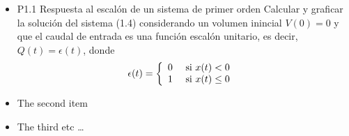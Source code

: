 \documentclass{article}
\begin{document}
% 
% 
% 
% 
% 
% 

\begin{itemize}

  \item P1.1 Respuesta al escalón de un sistema de primer orden
Calcular y graficar la solución del sistema (1.4) considerando un volumen inincial $ V(0)=0 $ y que el caudal de entrada es una función escalón unitario, es decir, $Q(t)=\epsilon(t)$, donde 
$$
\epsilon(t) = \left\{ \begin{array}{rl}
  0 &\mbox{ si $x(t) < 0$} \\
  1 &\mbox{ si $x(t) \leq 0$ }
       \end{array} \right.	\nonumber \\
$$

  \item The second item
  \item The third etc \ldots

\end{itemize}
\end{document}
